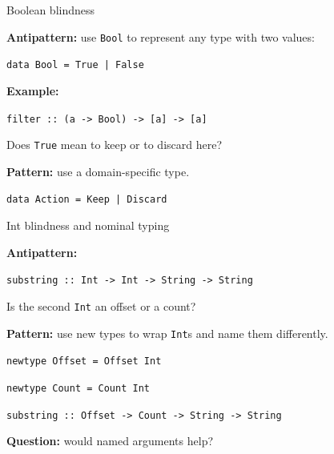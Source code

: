 \documentclass[handout]{beamer}
\begin{document}
\begin{frame}
  \titlepage
\end{frame}


\begin{frame}{Boolean blindness}

{\bf Antipattern:}
use {\tt Bool} to represent any type with two values:

\medskip

\centerline{\tt data Bool = True | False}

\bigskip

\pause

{\bf Example:}

\centerline{\tt filter :: (a -> Bool) -> [a] -> [a]}

\medskip

Does {\tt True} mean to keep or to discard here?

\bigskip

\pause

{\bf Pattern:} use a domain-specific type.

\medskip

\centerline{\tt data Action = Keep | Discard}

\end{frame}

\begin{frame}{Int blindness and nominal typing}

{\bf Antipattern:}
\par
{\tt substring :: Int -> Int -> String -> String}

\medskip

Is the second {\tt Int} an offset or a count?

\bigskip

\pause

{\bf Pattern:} use new types to wrap {\tt Int}s
and name them differently.

\medskip

{\tt newtype Offset = Offset Int } \par
{\tt newtype Count  = Count  Int } \par
{\tt substring :: Offset -> Count -> String -> String }

\bigskip

\pause

{\bf Question:} would named arguments help?

\end{frame}
\end{document}
